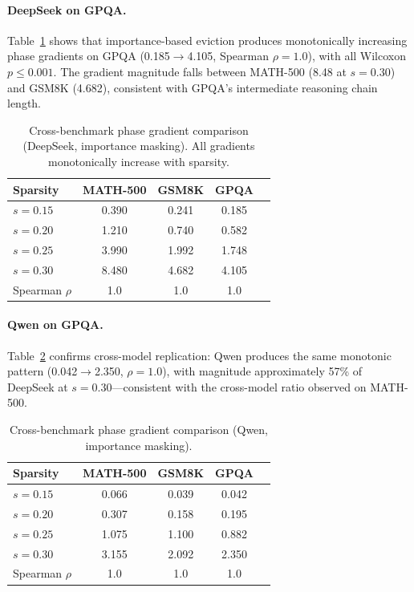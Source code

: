 \documentclass[11pt,a4paper]{article}
\begin{document}
\paragraph{DeepSeek on GPQA.} Table~\ref{tab:gpqa_ds} shows that importance-based eviction produces monotonically increasing phase gradients on GPQA (0.185$\to$4.105, Spearman $\rho=1.0$), with all Wilcoxon $p \leq 0.001$. The gradient magnitude falls between MATH-500 (8.48 at $s=0.30$) and GSM8K (4.682), consistent with GPQA's intermediate reasoning chain length.

\begin{table}[t]
\centering
\small
\caption{Cross-benchmark phase gradient comparison (DeepSeek, importance masking). All gradients monotonically increase with sparsity.}
\label{tab:gpqa_ds}
\begin{tabular}{lcccc}
\toprule
Sparsity & MATH-500 & GSM8K & GPQA \\
\midrule
$s=0.15$ & 0.390 & 0.241 & 0.185 \\
$s=0.20$ & 1.210 & 0.740 & 0.582 \\
$s=0.25$ & 3.990 & 1.992 & 1.748 \\
$s=0.30$ & 8.480 & 4.682 & 4.105 \\
\midrule
Spearman $\rho$ & 1.0 & 1.0 & 1.0 \\
\bottomrule
\end{tabular}
\end{table}

\paragraph{Qwen on GPQA.} Table~\ref{tab:gpqa_qw} confirms cross-model replication: Qwen produces the same monotonic pattern (0.042$\to$2.350, $\rho=1.0$), with magnitude approximately 57\% of DeepSeek at $s=0.30$---consistent with the cross-model ratio observed on MATH-500.

\begin{table}[t]
\centering
\small
\caption{Cross-benchmark phase gradient comparison (Qwen, importance masking).}
\label{tab:gpqa_qw}
\begin{tabular}{lcccc}
\toprule
Sparsity & MATH-500 & GSM8K & GPQA \\
\midrule
$s=0.15$ & 0.066 & 0.039 & 0.042 \\
$s=0.20$ & 0.307 & 0.158 & 0.195 \\
$s=0.25$ & 1.075 & 1.100 & 0.882 \\
$s=0.30$ & 3.155 & 2.092 & 2.350 \\
\midrule
Spearman $\rho$ & 1.0 & 1.0 & 1.0 \\
\bottomrule
\end{tabular}
\end{table}
\end{document}
